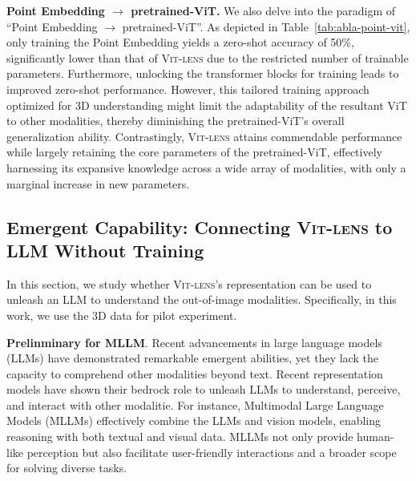 \documentclass{article}
\newcommand{\ptvit}{pretrained-ViT\xspace}
\newcommand{\vit}{ViT\xspace}
\newcommand{\methodname}{{\scshape Vit-lens}\xspace}
\begin{document}
\textbf{Point Embedding $\rightarrow$ \ptvit.} We also delve into the paradigm of ``Point Embedding $\rightarrow$ \ptvit''. As depicted in Table~\ref{tab:abla-point-vit}, only training the Point Embedding yields a zero-shot accuracy of 50\%, significantly lower than that of \methodname due to the restricted number of trainable parameters. 
Furthermore, unlocking the transformer blocks for training leads to improved zero-shot performance. However, this tailored training approach optimized for 3D understanding might limit the adaptability of the resultant \vit to other modalities, thereby diminishing the \ptvit's overall generalization ability. 
Contrastingly, \methodname attains commendable performance while largely retaining the core parameters of the \ptvit, effectively harnessing its expansive knowledge across a wide array of modalities, with only a marginal increase in new parameters.

\subsection{Emergent Capability: Connecting \methodname to LLM Without Training}
In this section, we study whether \methodname's representation can be used to unleash an LLM to understand the out-of-image modalities. Specifically, in this work, we use the 3D data for pilot experiment.

\textbf{Prelinminary for MLLM}. Recent advancements in large language models (LLMs) have demonstrated remarkable emergent abilities, yet they lack the capacity to comprehend other modalities beyond text. Recent representation models have shown their bedrock role to unleash LLMs to understand, perceive, and interact with other modalitie. For instance, Multimodal Large Language Models (MLLMs) effectively combine the LLMs and vision models, enabling reasoning with both textual and visual data. MLLMs not only provide human-like perception but also facilitate user-friendly interactions and a broader scope for solving diverse tasks.
\end{document}
